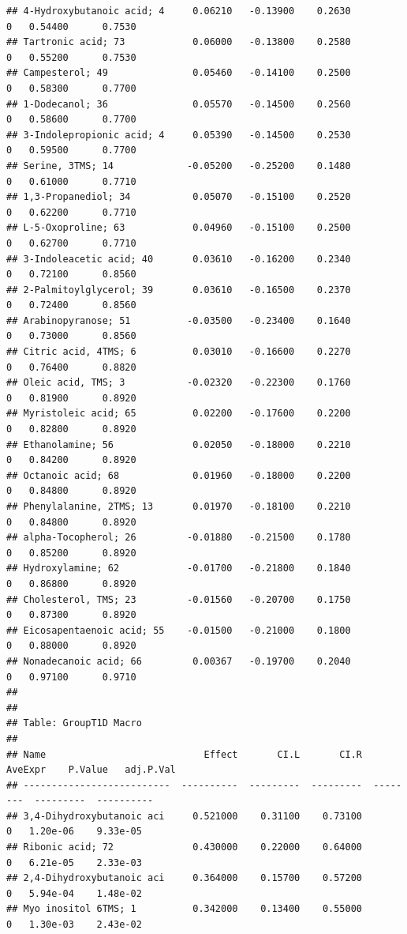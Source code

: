 \documentclass[]{article}
\begin{document}
\begin{verbatim}
## 4-Hydroxybutanoic acid; 4     0.06210   -0.13900    0.2630         0   0.54400      0.7530
## Tartronic acid; 73            0.06000   -0.13800    0.2580         0   0.55200      0.7530
## Campesterol; 49               0.05460   -0.14100    0.2500         0   0.58300      0.7700
## 1-Dodecanol; 36               0.05570   -0.14500    0.2560         0   0.58600      0.7700
## 3-Indolepropionic acid; 4     0.05390   -0.14500    0.2530         0   0.59500      0.7700
## Serine, 3TMS; 14             -0.05200   -0.25200    0.1480         0   0.61000      0.7710
## 1,3-Propanediol; 34           0.05070   -0.15100    0.2520         0   0.62200      0.7710
## L-5-Oxoproline; 63            0.04960   -0.15100    0.2500         0   0.62700      0.7710
## 3-Indoleacetic acid; 40       0.03610   -0.16200    0.2340         0   0.72100      0.8560
## 2-Palmitoylglycerol; 39       0.03610   -0.16500    0.2370         0   0.72400      0.8560
## Arabinopyranose; 51          -0.03500   -0.23400    0.1640         0   0.73000      0.8560
## Citric acid, 4TMS; 6          0.03010   -0.16600    0.2270         0   0.76400      0.8820
## Oleic acid, TMS; 3           -0.02320   -0.22300    0.1760         0   0.81900      0.8920
## Myristoleic acid; 65          0.02200   -0.17600    0.2200         0   0.82800      0.8920
## Ethanolamine; 56              0.02050   -0.18000    0.2210         0   0.84200      0.8920
## Octanoic acid; 68             0.01960   -0.18000    0.2200         0   0.84800      0.8920
## Phenylalanine, 2TMS; 13       0.01970   -0.18100    0.2210         0   0.84800      0.8920
## alpha-Tocopherol; 26         -0.01880   -0.21500    0.1780         0   0.85200      0.8920
## Hydroxylamine; 62            -0.01700   -0.21800    0.1840         0   0.86800      0.8920
## Cholesterol, TMS; 23         -0.01560   -0.20700    0.1750         0   0.87300      0.8920
## Eicosapentaenoic acid; 55    -0.01500   -0.21000    0.1800         0   0.88000      0.8920
## Nonadecanoic acid; 66         0.00367   -0.19700    0.2040         0   0.97100      0.9710
## 
## 
## Table: GroupT1D Macro
## 
## Name                            Effect       CI.L       CI.R   AveExpr    P.Value   adj.P.Val
## --------------------------  ----------  ---------  ---------  --------  ---------  ----------
## 3,4-Dihydroxybutanoic aci     0.521000    0.31100    0.73100         0   1.20e-06    9.33e-05
## Ribonic acid; 72              0.430000    0.22000    0.64000         0   6.21e-05    2.33e-03
## 2,4-Dihydroxybutanoic aci     0.364000    0.15700    0.57200         0   5.94e-04    1.48e-02
## Myo inositol 6TMS; 1          0.342000    0.13400    0.55000         0   1.30e-03    2.43e-02

\end{verbatim}
\end{document}
